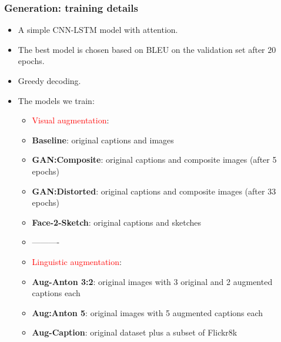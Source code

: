 \documentclass[aspectratio=1610]{beamer} %
\begin{document}
\begin{frame}
\frametitle{Generation: training details}
\begin{itemize}

	\item A simple CNN-LSTM model with attention.
	\item The best model is chosen based on BLEU on the validation set after $20$ epochs.
	\item Greedy decoding.
	\pause
	\item The models we train:
		\begin{itemize}
			\item \textcolor{red}{Visual augmentation}:
			\item \textbf{Baseline}: original captions and images
			\item \textbf{GAN:Composite}: original captions and composite images (after 5 epochs)
			\item \textbf{GAN:Distorted}: original captions and composite images (after 33 epochs)
			\item \textbf{Face-2-Sketch}: original captions and sketches  
			\item[] ----------
			\item \textcolor{red}{Linguistic augmentation}:
			\item \textbf{Aug-Anton 3:2}: original images with 3 original and 2 augmented captions each
			\item \textbf{Aug:Anton 5}: original images with 5 augmented captions each
			\item \textbf{Aug-Caption}: original dataset plus a subset of Flickr8k
		\end{itemize}

\end{itemize}
\end{frame}



\end{document}
